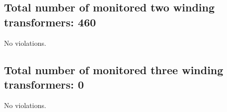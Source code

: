\documentclass{article}%
\begin{document}
%
\subsection*{Total number of monitored two winding transformers: 460}%
\label{subsec:Totalnumberofmonitoredtwowindingtransformers460}%
No violations.

%
\subsection*{Total number of monitored three winding transformers: 0}%
\label{subsec:Totalnumberofmonitoredthreewindingtransformers0}%
No violations.

%
\end{document}

